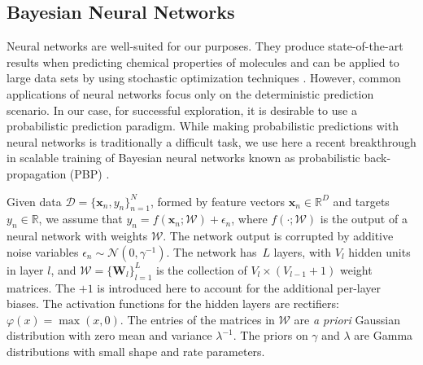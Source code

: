 \subsection{Bayesian Neural Networks}


Neural networks are well-suited for our purposes.
They produce state-of-the-art results when predicting chemical properties of molecules \cite{Ma_2015,Mayr_2016,ramsundar2015massively} and can be applied to large data sets by using stochastic optimization techniques \cite{bousquet2008tradeoffs}. However, common applications of neural networks focus only on the deterministic prediction scenario. In our case, for successful exploration, it is desirable to use a probabilistic prediction paradigm. While making probabilistic predictions with neural networks is traditionally a difficult task, we use here a recent breakthrough in scalable training of Bayesian neural networks known as probabilistic back-propagation (PBP) \cite{hernandez2015probabilistic}. 

Given data ${\mathcal{D} = \{\mathbf{x}_n, y_n \}_{n=1}^N}$, formed by feature vectors $\mathbf{x}_n \in \mathbb{R}^D$ and targets ${y_n \in \mathbb{R}}$, we assume that $y_n = f(\mathbf{x}_n;\mathcal{W}) + \epsilon_n$, where $f(\cdot ;\mathcal{W})$ is the output of a neural network with weights $\mathcal{W}$. The network output is corrupted by additive noise variables $\epsilon_n \sim \mathcal{N}(0,\gamma^{-1})$. The network has~$L$ layers, with $V_l$ hidden units in layer $l$, and $\mathcal{W} = \{ \mathbf{W}_l \}_{l=1}^L$ is the collection of $V_l \times (V_{l-1}+1)$ weight matrices. The $+1$ is introduced here to account for the additional per-layer biases. The activation functions for the hidden layers are rectifiers: $\varphi(x) = \max(x,0)$. The entries of the matrices in $\mathcal{W}$ are \emph{a priori} Gaussian distribution with zero mean and variance $\lambda^{-1}$. The priors on $\gamma$ and $\lambda$ are Gamma distributions with small shape and rate parameters.

